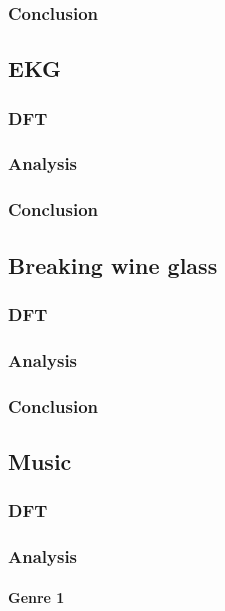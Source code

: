 \subsubsection{Conclusion}

\subsection{EKG}
\subsubsection{DFT}

\subsubsection{Analysis}

\subsubsection{Conclusion}

\subsection{Breaking wine glass}
\subsubsection{DFT}

\subsubsection{Analysis}

\subsubsection{Conclusion}

\subsection{Music}
\subsubsection{DFT}

\subsubsection{Analysis}

\paragraph{Genre 1}

